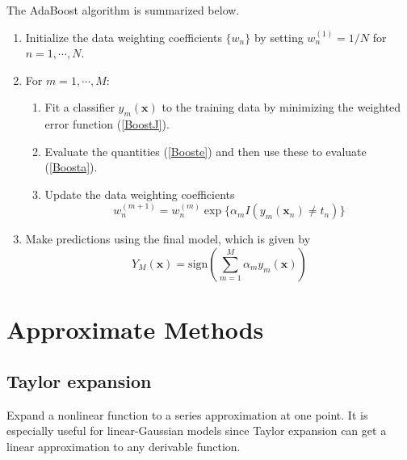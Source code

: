 \documentclass[a4paper]{book}
\newcommand{\up}{\mathrm}
\renewcommand{\bf}{\mathbf}
\begin{document}
The AdaBoost algorithm is summarized below.
\begin{enumerate}
	\item Initialize the data weighting coefficients $\{ w_n \}$ by setting $w_n^{(1)} = 1/N$ for $n = 1,\cdots,N$.
	\item For $m = 1,\cdots,M$:
		\begin{enumerate}
			\item Fit a classifier $y_m(\bf{x})$ to the training data by minimizing the weighted error function (\ref{BoostJ}).
			\item Evaluate the quantities (\ref{Booste}) and then use these to evaluate (\ref{Boosta}).
			\item Update the data weighting coefficients
			\begin{equation}
			w_n^{(m+1)} =	w_n^{(m)}\exp\{ \alpha_m I(y_m(\bf{x}_n)\neq t_n)\}
			\end{equation}
		\end{enumerate}
	\item Make predictions using the final model, which is given by
	\begin{equation}
		Y_M(\bf{x}) = \up{sign}\left( \sum_{m=1}^M \alpha_m y_m(\bf{x}) \right)
	\end{equation}
\end{enumerate}
\section{Approximate Methods}
\subsection{Taylor expansion}
Expand a nonlinear function to a series approximation at one point. It is especially useful for linear-Gaussian models since Taylor expansion can get a linear approximation to any derivable function.
\end{document}
